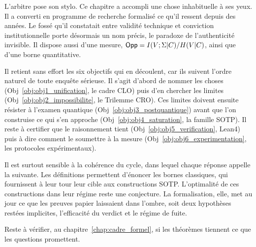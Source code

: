 
\begin{boiteArbitre}
L'arbitre pose son stylo. Ce chapitre a accompli une chose
inhabituelle \`a ses yeux. Il a converti en programme de recherche
formalis\'e ce qu'il ressent depuis des ann\'ees. Le foss\'e qu'il constatait entre validit\'e technique et
conviction institutionnelle porte d\'esormais un nom pr\'ecis, le paradoxe de
l'authenticit\'e invisible. Il dispose aussi d'une mesure, $\mathsf{Opp} = I(V;\Sigma|C)/H(V|C)$,
ainsi que d'une borne quantitative.

Il retient sans effort les six objectifs qui en d\'ecoulent, car ils suivent
l'ordre naturel de toute enqu\^ete s\'erieuse. Il s'agit d'abord de nommer les choses
(Obj~\ref{obj:obj1_unification}, le cadre CLO) puis d'en chercher les limites
(Obj~\ref{obj:obj2_impossibilite}, le Trilemme CRO). Ces limites doivent ensuite r\'esister \`a l'examen
quantique (Obj~\ref{obj:obj3_postquantique}) avant que l'on construise ce qui s'en approche
(Obj~\ref{obj:obj4_saturation}, la famille SOTP). Il reste \`a certifier que le raisonnement
tient (Obj~\ref{obj:obj5_verification}, Lean4) puis \`a dire comment le soumettre \`a la mesure
(Obj~\ref{obj:obj6_experimentation}, les protocoles exp\'erimentaux).

Il est surtout sensible \`a la coh\'erence du cycle, dans lequel chaque r\'eponse appelle
la suivante. Les d\'efinitions permettent d'\'enoncer les bornes
classiques, qui fournissent \`a leur tour leur cible aux constructions SOTP. L'optimalit\'e de ces
constructions dans leur r\'egime reste une conjecture. La formalisation, elle, met au jour ce que
les preuves papier laissaient dans l'ombre, soit deux hypoth\`eses rest\'ees implicites, l'efficacit\'e du verdict
et le r\'egime de fuite.

Reste \`a v\'erifier, au chapitre~\ref{chap:cadre_formel}, si les
th\'eor\`emes tiennent ce que les questions promettent.
\end{boiteArbitre}